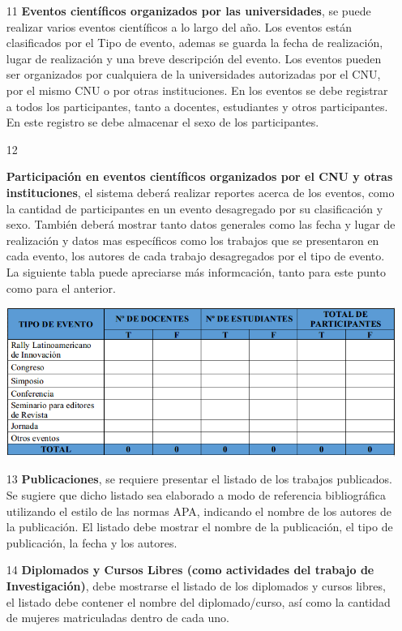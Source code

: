 \documentclass[12pt,letterpaper]{report}
\newcommand{\mb}{\vspace{0.5cm}}
\begin{document}
\begin{itemize}
\item[11]{
\textbf{Eventos científicos organizados por las universidades}, se puede realizar varios eventos científicos a lo largo del año. Los eventos están clasificados por el Tipo de evento, ademas se guarda la fecha de realización, lugar de realización y una breve descripción del evento. Los eventos pueden ser organizados por cualquiera de la universidades autorizadas por el CNU, por el mismo CNU o por otras instituciones. En los eventos se debe registrar a todos los participantes, tanto a docentes, estudiantes y otros participantes. En este registro se debe almacenar el sexo de los participantes.
}


\item[12]{
\textbf{Participación en eventos científicos organizados por el CNU y otras instituciones}, el sistema deberá realizar reportes acerca de los eventos, como la cantidad de participantes en un evento desagregado por su clasificación y sexo. También deberá mostrar tanto datos generales como las fecha y lugar de realización y datos mas específicos como los trabajos que se presentaron en cada evento, los autores de cada trabajo desagregados por el tipo de evento. La siguiente tabla puede apreciarse más informcación, tanto para este punto como para el anterior.

\mb
\centering
	\includegraphics[width=\textwidth]{img/tabla11_12.png}\par
\mb 
}


\item[13]{
\textbf{Publicaciones}, se requiere presentar el listado de los trabajos publicados. Se sugiere que dicho listado sea elaborado a modo de referencia bibliográfica utilizando el estilo de las normas APA, indicando el nombre de los autores de la publicación. El listado debe mostrar el nombre de la publicación, el tipo de publicación, la fecha y los autores.
}


\item[14]{
\textbf{Diplomados y Cursos Libres (como actividades del trabajo de Investigación)}, debe mostrarse el listado de los diplomados y cursos libres, el listado debe contener el nombre del diplomado/curso, así como la cantidad de mujeres matriculadas dentro de cada uno.
}



\end{itemize}
\end{document}
